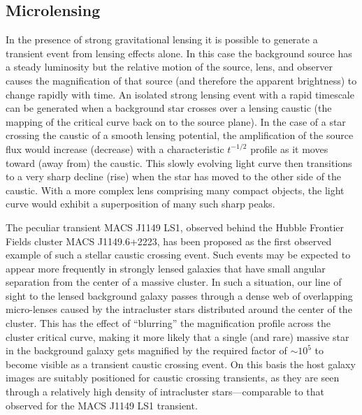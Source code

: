 \begin{multicols}{2}



\subsection{Microlensing}\label{sec:MicroLensing}

In the presence of strong gravitational lensing it is possible to
generate a transient event from lensing effects alone.  In this case
the background source has a steady luminosity but the relative motion
of the source, lens, and observer causes the magnification of that
source (and therefore the apparent brightness) to change rapidly with
time.  An isolated strong lensing event with a rapid timescale can be
generated when a background star crosses over a lensing caustic (the
mapping of the critical curve back on to the source plane).  In the
case of a star crossing the caustic of a smooth lensing potential, the
amplification of the source flux would increase (decrease) with a
characteristic $t^{-1/2}$ profile as it moves toward (away from) the
caustic. This slowly evolving light curve then transitions to a very
sharp decline (rise) when the star has moved to the other side of the
caustic\cite{Schneider:1986, MiraldaEscude:1991}.  With a more complex
lens comprising many compact objects, the light curve would exhibit a
superposition of many such sharp peaks\cite{Lewis:1993}.

The peculiar transient MACS J1149 LS1, observed behind the Hubble
Frontier Fields cluster MACS J1149.6+2223, has been proposed as the
first observed example of such a stellar caustic crossing
event\cite{Kelly:2017}. Such events may be
expected to appear more frequently in strongly lensed galaxies that
have small angular separation from the center of a massive cluster. In
such a situation, our line of sight to the lensed background galaxy
passes through a dense web of overlapping micro-lenses caused by the
intracluster stars distributed around the center of the cluster. This
has the effect of ``blurring'' the magnification profile across the
cluster critical curve, making it more likely that a single (and rare)
massive star in the background galaxy gets magnified by the required
factor of $\sim10^5$ to become visible as a transient caustic crossing
event.  On this basis the \spock host galaxy images are suitably
positioned for caustic crossing transients, as they are seen through a
relatively high density of intracluster stars---comparable to that
observed for the MACS J1149 LS1 transient.


\end{multicols}
